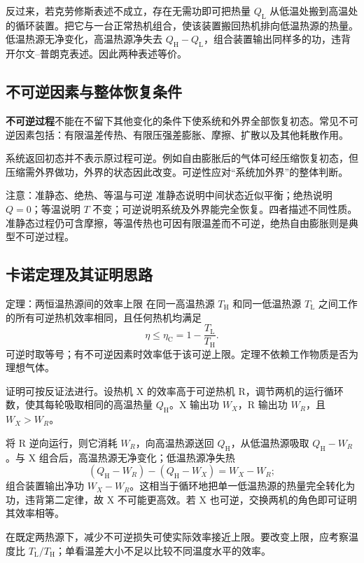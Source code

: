 \documentclass[UTF8,fontset=none,zihao=-4,a4paper]{ctexart}
\newcommand{\term}[1]{\textbf{#1}}
\begin{document}
反过来，若克劳修斯表述不成立，存在无需功即可把热量 $Q_{\mathrm L}$ 从低温处搬到高温处的循环装置。把它与一台正常热机组合，使该装置搬回热机排向低温热源的热量。低温热源无净变化，高温热源净失去 $Q_{\mathrm H}-Q_{\mathrm L}$，组合装置输出同样多的功，违背开尔文--普朗克表述。因此两种表述等价。

\subsection{不可逆因素与整体恢复条件}
\term{不可逆过程}不能在不留下其他变化的条件下使系统和外界全部恢复初态。常见不可逆因素包括：有限温差传热、有限压强差膨胀、摩擦、扩散以及其他耗散作用。

系统返回初态并不表示原过程可逆。例如自由膨胀后的气体可经压缩恢复初态，但压缩需外界做功，外界的状态因此改变。可逆性应对“系统加外界”的整体判断。

\begin{infobox}{注意：准静态、绝热、等温与可逆}
准静态说明中间状态近似平衡；绝热说明 $Q=0$；等温说明 $T$ 不变；可逆说明系统及外界能完全恢复。四者描述不同性质。准静态过程仍可含摩擦，等温传热也可因有限温差而不可逆，绝热自由膨胀则是典型不可逆过程。
\end{infobox}

\subsection{卡诺定理及其证明思路}
\begin{infobox}{定理：两恒温热源间的效率上限}
在同一高温热源 $T_{\mathrm H}$ 和同一低温热源 $T_{\mathrm L}$ 之间工作的所有可逆热机效率相同，且任何热机均满足
\[
 \eta\le\eta_{\mathrm C}=1-\frac{T_{\mathrm L}}{T_{\mathrm H}}.
\]
可逆时取等号；有不可逆因素时效率低于该可逆上限。定理不依赖工作物质是否为理想气体。
\end{infobox}
证明可按反证法进行。设热机 X 的效率高于可逆热机 R，调节两机的运行循环数，使其每轮吸取相同的高温热量 $Q_{\mathrm H}$。X 输出功 $W_X$，R 输出功 $W_R$，且 $W_X>W_R$。

将 R 逆向运行，则它消耗 $W_R$，向高温热源送回 $Q_{\mathrm H}$，从低温热源吸取 $Q_{\mathrm H}-W_R$。与 X 组合后，高温热源无净变化；低温热源净失热
\[
 (Q_{\mathrm H}-W_R)-(Q_{\mathrm H}-W_X)=W_X-W_R;
\]
组合装置输出净功 $W_X-W_R$。这相当于循环地把单一低温热源的热量完全转化为功，违背第二定律，故 X 不可能更高效。若 X 也可逆，交换两机的角色即可证明其效率相等。

在既定两热源下，减少不可逆损失可使实际效率接近上限。要改变上限，应考察温度比 $T_{\mathrm L}/T_{\mathrm H}$；单看温差大小不足以比较不同温度水平的效率。
\end{document}

